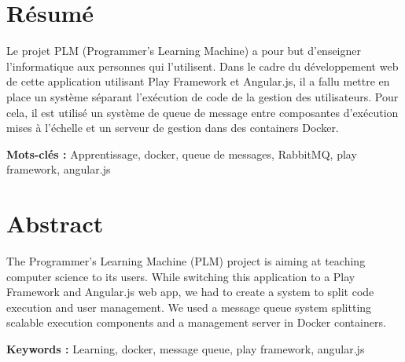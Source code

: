 \documentclass[stage]{tnreport}
\begin{document}
\cleardoublepage
\thispagestyle{empty}

\section*{Résumé}
Le projet PLM (Programmer's Learning Machine) a pour but d'enseigner l'informatique aux personnes qui l'utilisent. Dans le cadre du développement web de cette application utilisant Play Framework et Angular.js, il a fallu mettre en place un système séparant l'exécution de code de la gestion des utilisateurs. Pour cela, il est utilisé un système de queue de message entre composantes d'exécution mises à l'échelle et un serveur de gestion dans des containers Docker.

{\bf Mots-clés :} Apprentissage, docker, queue de messages, RabbitMQ, play framework, angular.js


\section*{Abstract}
The Programmer's Learning Machine (PLM) project is aiming at teaching computer science to its users. While switching this application to a Play Framework and Angular.js web app, we had to create a system to split code execution and user management. We used a message queue system splitting scalable execution components and a management server in Docker containers.

{\bf Keywords :} Learning, docker, message queue, play framework, angular.js
\end{document}
